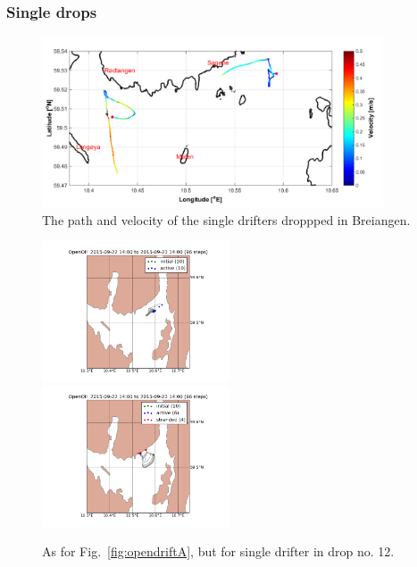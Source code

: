 \documentclass[12pt,a4paper,english]{article}
\begin{document}
\subsubsection{Single drops}
%
\begin{figure}[ht]
\centerline{
\includegraphics*[width=0.9\textwidth]{Figurer/zoneD}}
\caption{\small
The path and velocity of the single drifters droppped in Breiangen.}
\label{fig:ZoneD}
\end{figure}
%
\begin{figure}[ht]
\centerline{
\includegraphics*[width=0.495\textwidth]{Opendrift_simulations/dropzone_D_no12_fjordos_arome}
\includegraphics*[width=0.495\textwidth]{Opendrift_simulations/dropzone_D_no12_norkyst_arome}
}
\caption{\small
As for Fig.~\ref{fig:opendriftA}, but for single drifter in drop no. 12.
}
\label{fig:opendriftD1}
\end{figure}
%
\end{document}

